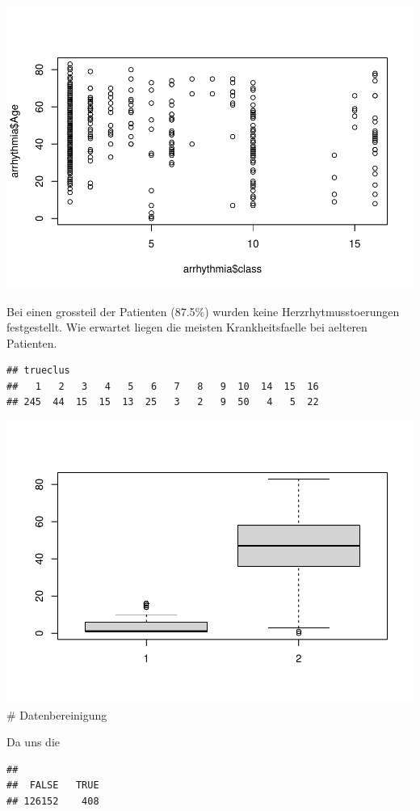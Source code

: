 \documentclass[
]{article}
\begin{document}
\includegraphics{Bericht_01_files/figure-latex/DatenInspektion wahre Klassifizierung-1.pdf}

Bei einen grossteil der Patienten (87.5\%) wurden keine
Herzrhytmusstoerungen festgestellt. Wie erwartet liegen die meisten
Krankheitsfaelle bei aelteren Patienten.

\begin{verbatim}
## trueclus
##   1   2   3   4   5   6   7   8   9  10  14  15  16 
## 245  44  15  15  13  25   3   2   9  50   4   5  22
\end{verbatim}

\includegraphics{Bericht_01_files/figure-latex/DatenInspektion 3-1.pdf}
\# Datenbereinigung

Da uns die

\begin{verbatim}
## 
##  FALSE   TRUE 
## 126152    408
\end{verbatim}
\end{document}
